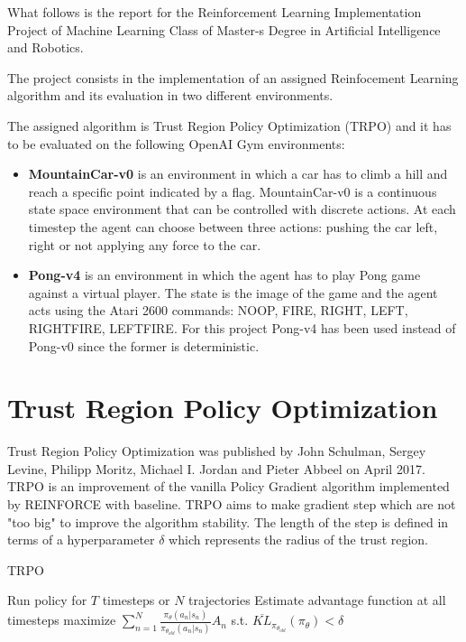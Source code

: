 \documentclass[12pt,a4paper]{article}
\begin{document}
What follows is the report for the Reinforcement Learning Implementation Project of Machine Learning Class of Master-s Degree in Artificial Intelligence and Robotics.

The project consists in the implementation of an assigned Reinfocement Learning algorithm and its evaluation in two different environments.

The assigned algorithm is Trust Region Policy Optimization (TRPO) and it has to be evaluated on the following OpenAI Gym environments:
\begin{itemize}
    \item \textbf{MountainCar-v0} is an environment in which a car has to climb a hill and reach a specific point indicated by a flag. MountainCar-v0 is a continuous state space environment that can be controlled with discrete actions. At each timestep the agent can choose between three actions: pushing the car left, right or not applying any force to the car.
    \item \textbf{Pong-v4} is an environment in which the agent has to play Pong game against a virtual player. The state is the image of the game and the agent acts using the Atari 2600 commands: NOOP, FIRE, RIGHT, LEFT, RIGHTFIRE, LEFTFIRE. For this project Pong-v4 has been used instead of Pong-v0 since the former is deterministic.
\end{itemize}

\section{Trust Region Policy Optimization}

Trust Region Policy Optimization was published by John Schulman, Sergey Levine, Philipp Moritz, Michael I. Jordan and Pieter Abbeel on April 2017. 
TRPO is an improvement of the vanilla Policy Gradient algorithm implemented by REINFORCE with baseline. TRPO aims to make gradient step which are not "too big" to improve the algorithm stability. The length of the step is defined in terms of a hyperparameter $\delta$ which represents the radius of the trust region.

\begin{algorithm}[H]
    \caption{TRPO}
\begin{algorithmic}[1]
    \STATE Run policy for $T$ timesteps or $N$ trajectories
    \STATE Estimate advantage function at all timesteps
        \STATE maximize $\sum_{n=1}^N \frac{\pi_\theta(a_n|s_n)}{\pi_{\theta_{old}}(a_n|s_n)} A_n$
        \STATE s.t. $\overline{KL}_{\pi_{\theta_{old}}}(\pi_\theta) < \delta$
    \ENDFOR
\ENDFOR
\end{algorithmic}
\label{alg:TRPO}
\end{algorithm}
\end{document}
